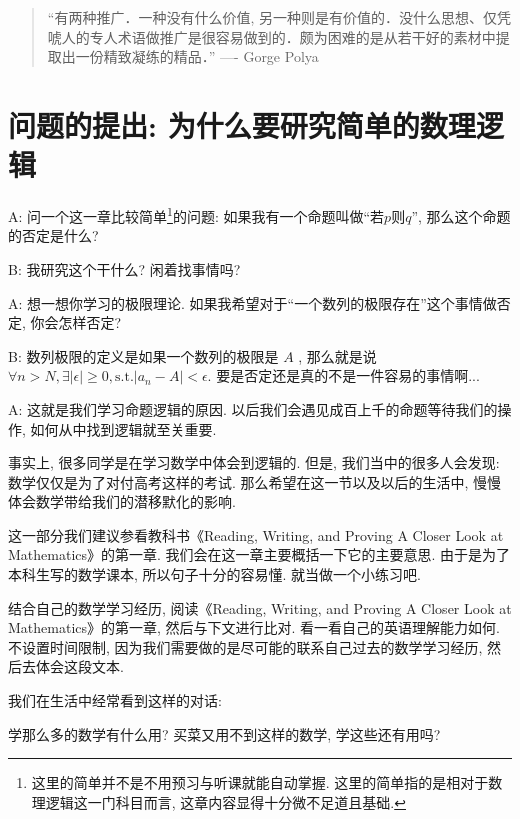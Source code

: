\begin{quote}
	“有两种推广．一种没有什么价值, 另一种则是有价值的．没什么思想、仅凭唬人的专人术语做推广是很容易做到的．颇为困难的是从若干好的素材中提取出一份精致凝练的精品．”
	\hfill ---- Gorge Polya
\end{quote}

\section{问题的提出: 为什么要研究简单的数理逻辑}


\begin{dialogue}
	A: 问一个这一章比较简单\footnote{这里的简单并不是不用预习与听课就能自动掌握. 这里的简单指的是相对于数理逻辑这一门科目而言, 这章内容显得十分微不足道且基础.}的问题: 如果我有一个命题叫做``若$p$则$q$'', 那么这个命题的否定是什么?
	
	B: 我研究这个干什么? 闲着找事情吗? 
	
	A: 想一想你学习的极限理论. 如果我希望对于``一个数列的极限存在''这个事情做否定, 你会怎样否定? 
	
	B: 数列极限的定义是如果一个数列的极限是 $A$ , 那么就是说$\forall n>N, \exists |\epsilon|\geq 0, \text{s.t.} |a_n-A|<\epsilon$. 要是否定还是真的不是一件容易的事情啊...
	
	A: 这就是我们学习命题逻辑的原因. 以后我们会遇见成百上千的命题等待我们的操作, 如何从中找到逻辑就至关重要. 
\end{dialogue}

事实上, 很多同学是在学习数学中体会到逻辑的. 但是, 我们当中的很多人会发现: 数学仅仅是为了对付高考这样的考试. 那么希望在这一节以及以后的生活中, 慢慢体会数学带给我们的潜移默化的影响. 

这一部分我们建议参看教科书《Reading, Writing, and Proving A Closer Look at Mathematics》的第一章. 我们会在这一章主要概括一下它的主要意思. 由于是为了本科生写的数学课本, 所以句子十分的容易懂. 就当做一个小练习吧. 

\begin{prob}
	结合自己的数学学习经历, 阅读《Reading, Writing, and Proving A Closer Look at Mathematics》的第一章, 然后与下文进行比对. 看一看自己的英语理解能力如何. 不设置时间限制, 因为我们需要做的是尽可能的联系自己过去的数学学习经历, 然后去体会这段文本. 
\end{prob}


我们在生活中经常看到这样的对话: 
\begin{dialogue}
	学那么多的数学有什么用? 买菜又用不到这样的数学, 学这些还有用吗? 
\end{dialogue}

